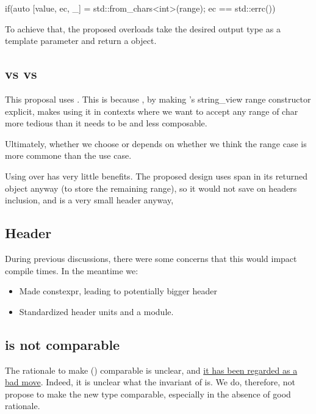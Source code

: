 \documentclass{wg21}
\begin{document}
\begin{colorblock}
if(auto [value, ec, _]  = std::from_chars<int>(range); ec == std::errc()) {}
\end{colorblock}

To achieve that, the proposed  overloads take the desired output type as a template parameter
and return a  object.

\subsection{ vs  vs }
This proposal uses .
This is because , by making 's string_view range constructor explicit, makes using it in contexts where we want to accept any range of char more tedious than it needs to be and less composable.

Ultimately, whether we choose  or  depends on whether we think the range case is more commone than the  use case.

Using  over  has very little benefits.
The proposed design uses span in its returned object anyway (to store the remaining range), so it would not save on headers inclusion, and  is a very small header anyway,

\subsection{Header}

During previous discussions, there were some concerns that this would impact compile times.
In the meantime we:

\begin{itemize}
\item Made  constexpr, leading to potentially bigger header
\item Standardized header units and a  module.
\end{itemize}

\subsection{ is not comparable}

The rationale to make  () comparable is unclear, and \href{https://lists.isocpp.org/lib/2021/11/21141.php}{it has been regarded as a bad move}.
Indeed, it is unclear what the invariant of  is.
We do, therefore, not propose to make the new  type comparable, especially in the absence of good rationale.
\end{document}

